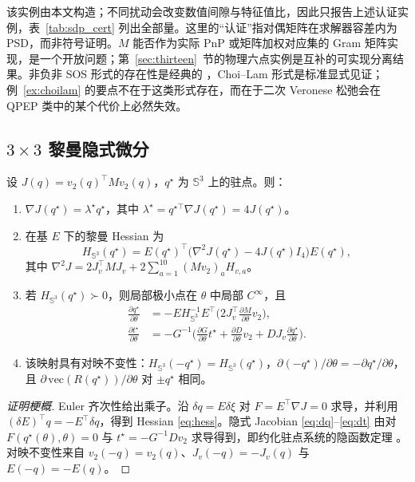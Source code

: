 该实例由本文构造；不同扰动会改变数值间隙与特征值比，因此只报告上述认证实例，表~\ref{tab:sdp_cert} 列出全部量。这里的“认证”指对偶矩阵在求解器容差内为 PSD，而非符号证明。$M$ 能否作为实际 PnP 或矩阵加权对应集的 Gram 矩阵实现，是一个开放问题；第~\ref{sec:thirteen}~节的物理六点实例是互补的可实现分离结果。非负非 SOS 形式的存在性是经典的 \cite{hilbert1888,blekherman2006}，Choi--Lam 形式是标准显式见证；例~\ref{ex:choilam} 的要点不在于这类形式存在，而在于二次 Veronese 松弛会在 QPEP 类中的某个代价上必然失效。

\subsection{\texorpdfstring{$3\times3$}{3x3} 黎曼隐式微分}\label{sec:implicit}

\begin{theorem}\label{thm:implicit}
设 $J(q)=v_2(q)^\top Mv_2(q)$，$q^\star$ 为 $\mathbb{S}^3$ 上的驻点。则：
\begin{enumerate}
\item $\nabla J(q^\star)=\lambda^\star q^\star$，其中 $\lambda^\star=q^{\star\top}\nabla J(q^\star)=4J(q^\star)$。
\item 在基 $E$ 下的黎曼 Hessian 为
\begin{equation}
H_{\mathbb{S}^3}(q^\star)=E(q^\star)^\top\big(\nabla^2J(q^\star)-4J(q^\star)I_4\big)E(q^\star),
\label{eq:hess}
\end{equation}
其中 $\nabla^2J=2J_v^\top MJ_v+2\sum_{a=1}^{10}(Mv_2)_aH_{v,a}$。
\item 若 $H_{\mathbb{S}^3}(q^\star)\succ0$，则局部极小点在 $\theta$ 中局部 $C^\infty$，且
\begin{align}
\frac{\partial q^\star}{\partial\theta}&=-E H_{\mathbb{S}^3}^{-1}E^\top\Big(2J_v^\top\frac{\partial M}{\partial\theta}v_2\Big),\label{eq:dq}\\
\frac{\partial t^\star}{\partial\theta}&=-G^{-1}\Big(\frac{\partial G}{\partial\theta}t^\star+\frac{\partial D}{\partial\theta}v_2+DJ_v\frac{\partial q^\star}{\partial\theta}\Big).\label{eq:dt}
\end{align}
\item 该映射具有对映不变性：$H_{\mathbb{S}^3}(-q^\star)=H_{\mathbb{S}^3}(q^\star)$，$\partial(-q^\star)/\partial\theta=-\partial q^\star/\partial\theta$，且 $\partial\,\mathrm{vec}(R(q^\star))/\partial\theta$ 对 $\pm q^\star$ 相同。
\end{enumerate}
\end{theorem}

\begin{proof}[证明梗概]
Euler 齐次性给出乘子。沿 $\delta q=E\delta\xi$ 对 $F=E^\top\nabla J=0$ 求导，并利用 $(\delta E)^\top q=-E^\top\delta q$，得到 Hessian \eqref{eq:hess}。隐式 Jacobian \eqref{eq:dq}--\eqref{eq:dt} 由对 $F(q^\star(\theta),\theta)=0$ 与 $t^\star=-G^{-1}Dv_2$ 求导得到，即约化驻点系统的隐函数定理 \cite{dontchev2009}。对映不变性来自 $v_2(-q)=v_2(q)$、$J_v(-q)=-J_v(q)$ 与 $E(-q)=-E(q)$。
\end{proof}

